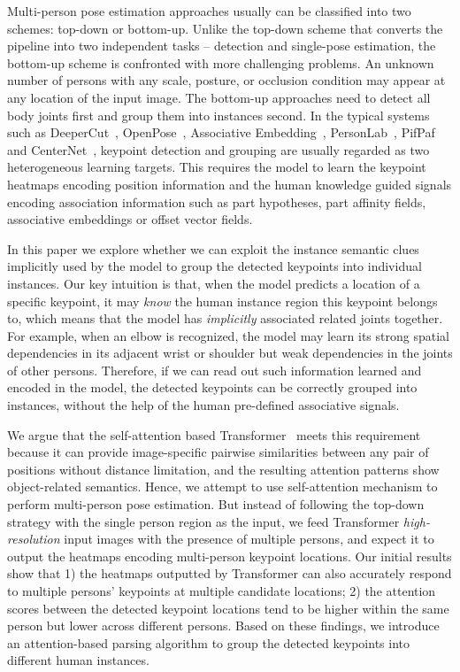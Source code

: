 \documentclass{article} \usepackage{iclr_conference,times}
\begin{document}
Multi-person pose estimation approaches usually can be classified into two schemes: top-down or bottom-up.
Unlike the top-down scheme that converts the pipeline into two independent tasks -- detection and single-pose estimation, the bottom-up scheme is confronted with more challenging problems. 
An unknown number of persons with any scale, posture, or occlusion condition may appear at any location of the input image. 
The bottom-up approaches need to detect all body joints first and group them into instances second. 
In the typical systems such as DeeperCut~\citep{deepercut:insafutdinov2016deepercut}, OpenPose~\citep{openpose:cao2017realtime}, Associative Embedding~\citep{ae:newell2016associative}, PersonLab~\citep{personlab:papandreou2018personlab}, PifPaf~\citep{pifpaf:kreiss2019pifpaf} and CenterNet~\citep{centernet:zhou2019objects}, keypoint detection and grouping are usually regarded as two heterogeneous learning targets. This requires the model to learn the keypoint heatmaps encoding position information and the human knowledge guided signals encoding association information such as part hypotheses, part affinity fields, associative embeddings or offset vector fields. 

In this paper we explore whether we can exploit the instance semantic clues implicitly used by the model to group the detected keypoints into individual instances. Our key intuition is that, when the model predicts a location of a specific keypoint, it may \textit{know} the human instance region this keypoint belongs to, which means that the model has \textit{implicitly} associated related joints together. For example, when an elbow is recognized, the model may learn its strong spatial dependencies in its adjacent wrist or shoulder but weak dependencies in the joints of other persons. Therefore, if we can read out such information learned and encoded in the model, the detected keypoints can be correctly grouped into instances, without the help of the human pre-defined associative signals. 

We argue that the self-attention based Transformer~\citep{vaswani2017attention} meets this requirement because it can provide image-specific pairwise similarities between any pair of positions without distance limitation, and the resulting attention patterns show object-related semantics. Hence, we attempt to use self-attention mechanism to perform multi-person pose estimation.  
But instead of following the top-down strategy with the single person region as the input, we feed Transformer \textit{high-resolution} input images with the presence of multiple persons, and expect it to output the heatmaps encoding multi-person keypoint locations. 
Our initial results show that 1) the heatmaps outputted by Transformer can also accurately respond to multiple persons' keypoints at multiple candidate locations;
2) the attention scores between the detected keypoint locations tend to be higher within the same person but lower across different persons. 
Based on these findings, we introduce an attention-based parsing algorithm to group the detected keypoints into different human instances. 
\end{document}
